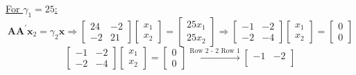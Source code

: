 \begin{enumerate}[font=\bfseries]
\begin{enumerate}
\[            \]
            \underline{For $\gamma_1 = 25$:}
            \[
                \mathbf{A}\mathbf{A}^\prime\mathbf{x}_2 = \gamma_2\mathbf{x}
                \Rightarrow
                \begin{bmatrix}
                    24 & -2 \\
                    -2 & 21
                \end{bmatrix}
                \begin{bmatrix}
                    x_1 \\
                    x_2
                \end{bmatrix}
                =
                \begin{bmatrix}
                    25 x_1\\
                    25 x_2
                \end{bmatrix}
                \Rightarrow
                \begin{bmatrix}
                    -1 & -2 \\
                    -2 & -4
                \end{bmatrix}
                \begin{bmatrix}
                    x_1 \\
                    x_2
                \end{bmatrix}
                =
                \begin{bmatrix}
                    0 \\
                    0
                \end{bmatrix}
            \]
            \[
                \begin{bmatrix}
                    -1 & -2 \\
                    -2 & -4
                \end{bmatrix}
                \begin{bmatrix}
                    x_1 \\
                    x_2
                \end{bmatrix}
                =
                \begin{bmatrix}
                    0 \\
                    0
                \end{bmatrix}
                \overset{\text{Row 2 - 2 Row 1}}{\longrightarrow}
                \begin{bmatrix}
                    -1 & -2 \\

\end{bmatrix}\]
\end{enumerate}
\end{enumerate}
